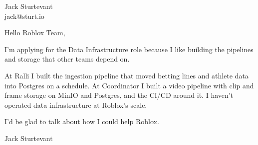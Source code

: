\documentclass[11pt]{article}
\begin{document}
\raggedright

{\namefont\fontsize{20pt}{24pt}\selectfont Jack Sturtevant}\\[-0.3em]
jack@sturt.io

\vspace{1.2em}

Hello Roblox Team,

I'm applying for the Data Infrastructure role because I like building the pipelines and storage that other teams depend on.

At Ralli I built the ingestion pipeline that moved betting lines and athlete data into Postgres on a schedule. At Coordinator I built a video pipeline with clip and frame storage on MinIO and Postgres, and the CI/CD around it. I haven't operated data infrastructure at Roblox's scale.

I'd be glad to talk about how I could help Roblox.

\vspace{0.6em}
Jack Sturtevant
\end{document}
